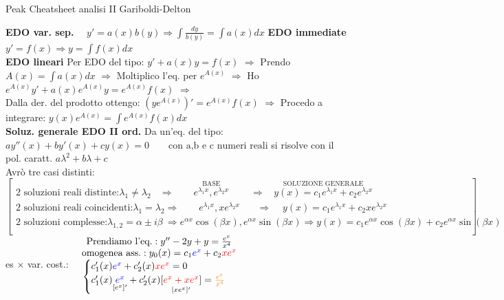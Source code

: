 \documentclass[a4paper, oneside]{article}
\newcommand{\tab}{\hspace*{2em}}
\begin{document}
\tiny
\begin{center}
    Peak Cheatsheet analisi II \tab Gariboldi-Delton
\end{center}
\noindent
\textbf{EDO var. sep.} $ \quad y' = a(x) b(y) \Rightarrow \int \frac{dy}{b(y)} = \int a(x) dx$ \tab \tab \textbf{EDO immediate} $y' = f(x) \Rightarrow y = \int f(x) dx$\\
\textbf{EDO lineari} Per EDO del tipo: $y' + a(x)y=f(x)$ $\Rightarrow$ Prendo $A(x)=\int a(x) dx$ $\Rightarrow$ Moltiplico l'eq. per $e^{A(x)}$ $\Rightarrow$ Ho $e^{A(x)}y' + a(x)e^{A(x)}y=e^{A(x)}f(x)$ $\Rightarrow$ \\Dalla der. del prodotto ottengo: $\left(ye^{A(x)}\right)'=e^{A(x)}f(x)$ $\Rightarrow$ Procedo a integrare: $y(x)e^{A(x)}=\int e^{A(x)}f(x) dx$\\
\textbf{Soluz. generale EDO II ord.} Da un'eq. del tipo: $a y''(x) + b y'(x) + c y(x) = 0 \qquad \text{con a,b e c numeri reali}$ si risolve con il pol. caratt. $a\lambda^2+ b\lambda + c$\\
Avrò tre casi distinti:
$\begin{bmatrix}
             \text{2 soluzioni reali distinte:} \lambda_1 \neq \lambda_2 \ \ \ \ \Rightarrow \ \ \ \ \ \ \ \ \ \overset{\text{BASE}}{e^{\lambda_1 x}, e^{\lambda_2 x}} \ \ \ \ \ \ \ \ \ \ \Rightarrow \ \ \ \ \overset{\text{SOLUZIONE GENERALE}}{y(x) = c_1 e^{\lambda_1 x} + c_2 e^{\lambda_2 x}}\\
             \text{2 soluzioni reali coincidenti:} \lambda_1 = \lambda_2 \Rightarrow \ \ \ \ \ \ \ \ \ e^{\lambda_1 x}, xe^{\lambda_2 x} \ \ \ \ \ \ \ \ \Rightarrow \ \ \ \ \ y(x) = c_1 e^{\lambda_1 x} + c_2 xe^{\lambda_2 x}\\
             \text{2 soluzioni complesse:} \lambda_{1,2} = \alpha \pm i \beta \ \Rightarrow e^{\alpha x} \cos(\beta x) , e^{\alpha x} \sin(\beta x) \Rightarrow y(x) = c_1e^{\alpha x} \cos(\beta x) + c_2 e^{\alpha x} \sin(\beta x)\\
\end{bmatrix}$ es $\times$ var. cost.: $\quad \begin{matrix}
    \text{Prendiamo l'eq.}: y'' -2y + y = \frac{e^x}{x^4}\\
    \text{omogenea ass.}: y_0(x) = c_1 \text{\textcolor{blue}{$e^x$}} + c_2 \text{\textcolor{red}{$xe^x$}}\\
    \begin{cases}
                c_1' (x) \text{\textcolor{blue}{$e^x$}} + c_2'(x) \text{\textcolor{red}{$xe^x$}} = 0\\
                c_1' (x) \underset{[e^x]'}{\text{\textcolor{blue}{$e^x$}}} + c_2'(x) \underset{[xe^x]'}{\text{[\textcolor{red}{$e^x+ xe^x$}]}} = \text{\textcolor{orange}{$\frac{e^x}{x^4}$}}\\
            \end{cases}\\
\end{matrix}$\\
\end{document}

